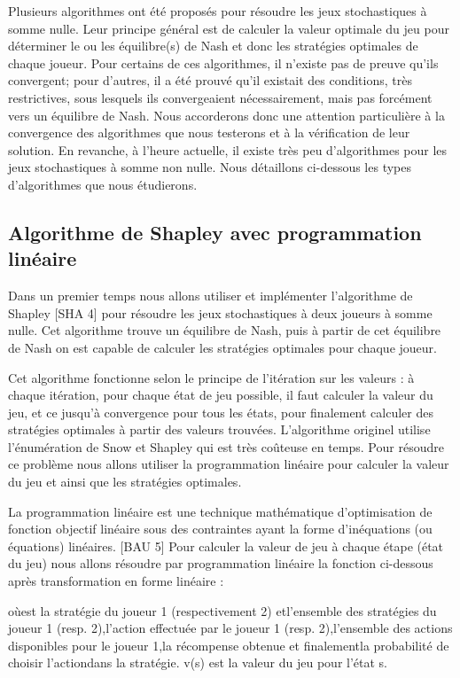\documentclass{article}
\begin{document}
Plusieurs algorithmes ont été proposés pour résoudre les jeux stochastiques à somme nulle. Leur principe général est de calculer la valeur optimale du jeu pour déterminer le ou les équilibre(s) de Nash et donc les stratégies optimales de chaque joueur. Pour certains de ces algorithmes, il n’existe pas de preuve qu’ils convergent; pour d’autres, il a été prouvé qu’il existait des conditions, très restrictives, sous lesquels ils convergeaient nécessairement, mais pas forcément vers un équilibre de Nash. Nous accorderons donc une attention particulière à la convergence des algorithmes que nous testerons et à la vérification de leur solution. En revanche, à l’heure actuelle, il existe très peu d’algorithmes pour les jeux stochastiques à somme non nulle. Nous détaillons ci-dessous les types d’algorithmes que nous étudierons.

\subsection{Algorithme de Shapley avec programmation linéaire}
Dans un premier temps nous allons utiliser et implémenter l'algorithme de Shapley [SHA 4] pour résoudre les jeux stochastiques à deux joueurs à somme nulle. Cet algorithme trouve un équilibre de Nash, puis à partir de cet équilibre de Nash on est capable de calculer les stratégies optimales pour chaque joueur.

Cet algorithme fonctionne selon le principe de l’itération sur les valeurs : à chaque itération, pour chaque état de jeu possible, il faut calculer la valeur du jeu, et ce jusqu’à convergence pour tous les états, pour finalement calculer des stratégies optimales à partir des valeurs trouvées. L’algorithme originel utilise l’énumération de Snow et Shapley qui est très coûteuse en temps. Pour résoudre ce problème nous allons utiliser la programmation linéaire pour calculer la valeur du jeu et ainsi que les stratégies optimales. 

La programmation linéaire est une technique mathématique d'optimisation de fonction objectif linéaire sous des contraintes ayant la forme d'inéquations (ou équations) linéaires. [BAU 5] Pour calculer la valeur de jeu à chaque étape (état du jeu) nous allons résoudre par programmation linéaire la fonction ci-dessous après transformation en forme linéaire :
		 
oùest la stratégie du joueur 1 (respectivement 2) etl’ensemble des stratégies du joueur 1 (resp. 2),l’action effectuée par le joueur 1 (resp. 2),l’ensemble des actions disponibles pour le joueur 1,la récompense obtenue et finalementla probabilité de choisir l’actiondans la stratégie. v(s) est la valeur du jeu pour l’état s.
\end{document}
